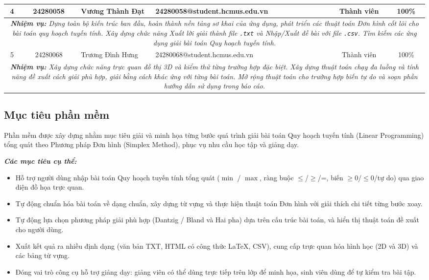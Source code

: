 \documentclass[12pt,a4paper]{article}
\begin{document}
{\begin{longtable}{|c|c|l|l|c|c|}
        4 & 24280058 & Vương Thành Đạt
          & {\footnotesize 24280058@student.hcmus.edu.vn}
          & Thành viên & 100\% \\ \hline
        \multicolumn{6}{|p{\dimexpr\textwidth-2\tabcolsep-2\arrayrulewidth\relax}|}{%
        \cellcolor{blue!5}\textit{\textbf{Nhiệm vụ:} Dựng toàn bộ kiến trúc ban đầu, hoàn thành nền tảng sơ khai của ứng dụng, phát triển các thuật toán Đơn hình cốt lõi cho bài toán quy hoạch tuyến tính. Xây dựng chức năng Xuất lời giải thành file \texttt{.txt} và Nhập/Xuất đề bài với file \texttt{.csv}. Tìm kiếm các ứng dụng giải bài toán Quy hoạch tuyến tính.}}\\ \hline

        5 & 24280068 & Trương Đình Hưng
          & {\footnotesize 24280068@student.hcmus.edu.vn}
          & Thành viên & 100\% \\ \hline
        \multicolumn{6}{|p{\dimexpr\textwidth-2\tabcolsep-2\arrayrulewidth\relax}|}{%
        \cellcolor{blue!5}\textit{\textbf{Nhiệm vụ:} Xây dựng chức năng trực quan đồ thị 3D và kiểm thử từng trường hợp đặc biệt. Xây dựng thuật toán chạy đa luồng và tính năng đề xuất cách giải phù hợp, giải bằng cách khác ứng với từng bài toán. Mở rộng thuật toán cho trường hợp biến tự do và soạn phần hướng dẫn sử dụng trong báo cáo.}} \\ \hline
    \end{longtable}
}

\subsection{Mục tiêu phần mềm}
Phần mềm được xây dựng nhằm mục tiêu giải và minh họa từng bước quá trình giải bài toán Quy hoạch tuyến tính (Linear Programming) tổng quát theo Phương pháp Đơn hình (Simplex Method), phục vụ nhu cầu học tập và giảng dạy.

\medskip
\noindent\textit{\textbf{Các mục tiêu cụ thể:}}
\begin{itemize}[label=\textcolor{secondary}{$\bullet$}, itemsep=1pt]
    \item Hỗ trợ người dùng nhập bài toán Quy hoạch tuyến tính tổng quát ($\min$ / $\max$, ràng buộc $\leq$/$\geq$/=, biến $\geq 0$/$\leq 0$/tự do) qua giao diện đồ họa trực quan. 
    \item Tự động chuẩn hóa bài toán về dạng chuẩn, xây dựng từ vựng và thực hiện thuật toán Đơn hình với giải thích chi tiết từng bước xoay. 
    \item Tự động lựa chọn phương pháp giải phù hợp (Dantzig / Bland và Hai pha) dựa trên cấu trúc bài toán, và hiển thị thuật toán đề xuất cho người dùng. 
    \item Xuất kết quả ra nhiều định dạng (văn bản TXT, HTML có công thức \LaTeX, CSV), cung cấp trực quan hóa hình học (2D và 3D) và các bảng từ vựng.
    \item Đóng vai trò công cụ hỗ trợ giảng dạy: giảng viên có thể dùng trực tiếp trên lớp để minh họa, sinh viên dùng để tự kiểm tra bài tập. 
\end{itemize}
\end{document}
